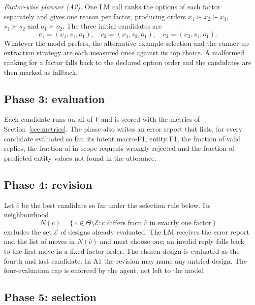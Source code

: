 \documentclass[conference]{IEEEtran}
\begin{document}
\emph{Factor-wise planner (A2).} One LM call ranks the options of each factor separately and gives one reason per factor, producing orders $x_1\succ x_2\succ x_3$, $s_1\succ s_2$ and $o_1\succ o_2$. The three initial candidates are
\begin{equation}
c_1=(x_1,s_1,o_1),\quad c_2=(x_1,s_2,o_1),\quad c_3=(x_2,s_1,o_1).
\end{equation}
Whatever the model prefers, the alternative example selection and the runner-up extraction strategy are each measured once against its top choice. A malformed ranking for a factor falls back to the declared option order and the candidates are then marked as fallback.

\subsection{Phase 3: evaluation}

Each candidate runs on all of $V$ and is scored with the metrics of Section~\ref{sec:metrics}. The phase also writes an error report that lists, for every candidate evaluated so far, its intent macro-F1, entity F1, the fraction of valid replies, the fraction of in-scope requests wrongly rejected and the fraction of predicted entity values not found in the utterance.

\subsection{Phase 4: revision}

Let $\hat{c}$ be the best candidate so far under the selection rule below. Its neighbourhood
\begin{equation}
N(\hat{c})=\{\,c\in\Theta \setminus \mathcal{E} : c \text{ differs from } \hat{c} \text{ in exactly one factor}\,\}
\end{equation}
excludes the set $\mathcal{E}$ of designs already evaluated. The LM receives the error report and the list of moves in $N(\hat{c})$ and must choose one; an invalid reply falls back to the first move in a fixed factor order. The chosen design is evaluated as the fourth and last candidate. In A1 the revision may name any untried design. The four-evaluation cap is enforced by the agent, not left to the model.

\subsection{Phase 5: selection}
\end{document}
